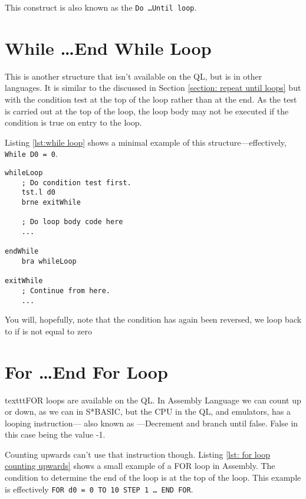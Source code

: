 This construct is also known as the \texttt{Do \ldots Until loop}.

\section{While \ldots\protect End While Loop}\label{section: while loops}

This is another structure that isn't available on the QL, but is in other languages. It is similar to the  discussed in Section \ref{section: repeat until loops} but with the condition test at the top of the loop rather than at the end. As the test is carried out at the top of the loop, the loop body may not be executed if the condition is true on entry to the loop.

Listing \ref{lst:while loop} shows a minimal example of this structure---effectively, \texttt{While D0 = 0}.

\begin{lstlisting}[caption={WHILE \ldots END WHILE},label={lst:while loop}]
whileLoop
    ; Do condition test first.
    tst.l d0
    brne exitWhile

    ; Do loop body code here
    ...
    
endWhile
    bra whileLoop

exitWhile
    ; Continue from here.
    ...
\end{lstlisting}

You will, hopefully, note that the condition has again been reversed, we loop back to  if  is not equal to zero

\section{For \ldots\protect End For Loop}

texttt{FOR} loops are available on the QL. In Assembly Language we can count up or down, as we can in S*BASIC, but the CPU in the QL, and emulators, has a looping instruction--- also known as ---Decrement  and branch until false. False in this case being the value -1.

Counting upwards can't use that instruction though. Listing \ref{lst: for loop counting upwards} shows a small example of a FOR loop in Assembly. The condition to determine the end of the loop is at the top of the loop. This example is effectively \texttt{FOR d0 = 0 TO 10 STEP 1 \ldots{} END FOR}.

